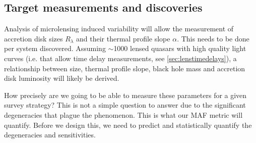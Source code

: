 
\subsection{Target measurements and discoveries}
\label{sec:\secname:targets}



Analysis of microlensing induced variability will allow the measurement of 
accretion disk sizes $R_\lambda$ and their thermal profile slope $\alpha$. This 
needs to be done per system discovered. Assuming $\sim$1000 lensed quasars with 
high quality light curves (i.e. that allow time delay measurements, see 
\autoref{sec:lenstimedelays}), a relationship between size, thermal profile 
slope, black hole mass and accretion disk luminosity will likely be derived.

How precisely are we going to be able to measure these parameters for a given 
survey strategy? This is not a simple question to answer due to the significant 
degeneracies that plague the phenomenon. This is what our MAF metric will 
quantify. Before we design this, we need to predict and statistically quantify 
the degeneracies and sensitivities.


